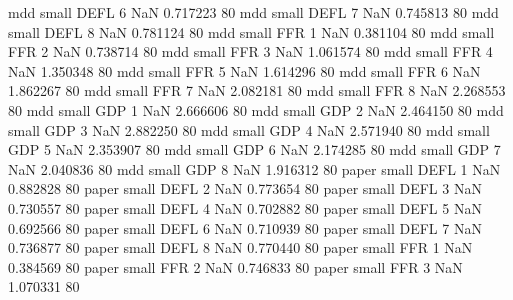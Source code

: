               mdd      small     DEFL                 6                  NaN 0.717223 80
              mdd      small     DEFL                 7                  NaN 0.745813 80
              mdd      small     DEFL                 8                  NaN 0.781124 80
              mdd      small      FFR                 1                  NaN 0.381104 80
              mdd      small      FFR                 2                  NaN 0.738714 80
              mdd      small      FFR                 3                  NaN 1.061574 80
              mdd      small      FFR                 4                  NaN 1.350348 80
              mdd      small      FFR                 5                  NaN 1.614296 80
              mdd      small      FFR                 6                  NaN 1.862267 80
              mdd      small      FFR                 7                  NaN 2.082181 80
              mdd      small      FFR                 8                  NaN 2.268553 80
              mdd      small      GDP                 1                  NaN 2.666606 80
              mdd      small      GDP                 2                  NaN 2.464150 80
              mdd      small      GDP                 3                  NaN 2.882250 80
              mdd      small      GDP                 4                  NaN 2.571940 80
              mdd      small      GDP                 5                  NaN 2.353907 80
              mdd      small      GDP                 6                  NaN 2.174285 80
              mdd      small      GDP                 7                  NaN 2.040836 80
              mdd      small      GDP                 8                  NaN 1.916312 80
            paper      small     DEFL                 1                  NaN 0.882828 80
            paper      small     DEFL                 2                  NaN 0.773654 80
            paper      small     DEFL                 3                  NaN 0.730557 80
            paper      small     DEFL                 4                  NaN 0.702882 80
            paper      small     DEFL                 5                  NaN 0.692566 80
            paper      small     DEFL                 6                  NaN 0.710939 80
            paper      small     DEFL                 7                  NaN 0.736877 80
            paper      small     DEFL                 8                  NaN 0.770440 80
            paper      small      FFR                 1                  NaN 0.384569 80
            paper      small      FFR                 2                  NaN 0.746833 80
            paper      small      FFR                 3                  NaN 1.070331 80
